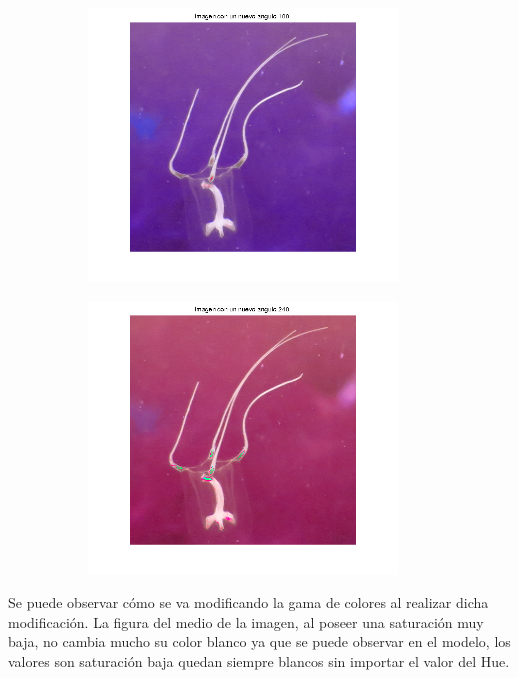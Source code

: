 \documentclass{article}
\begin{document}
\begin{figure}[H]
\begin{subfigure}{0.5\textwidth}
	\centering
        \includegraphics[width=0.9\textwidth]{1901-h-180.png}
    \end{subfigure}\hfill
	\begin{subfigure}{0.5\textwidth}
	\centering
        \includegraphics[width=0.9\textwidth]{1901-h-240.png}
    \end{subfigure}\hfill
\end{figure}\hfill

Se puede observar cómo se va modificando la gama de colores al realizar dicha modificación. La figura del medio de la imagen, al poseer una saturación muy baja, no cambia  mucho su color blanco ya que se puede observar en el modelo, los valores son saturación baja quedan siempre blancos sin importar el valor del Hue. 
\end{document}
